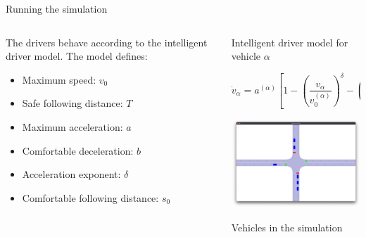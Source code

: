 \documentclass[english, aspectratio=169]{beamer}
\begin{document}
\begin{frame}{Running the simulation}
\begin{columns}

\begin{column}{0.4\textwidth}
	The drivers behave according to the intelligent driver model. The model defines:
	\begin{itemize}
		\item Maximum speed: $v_{0}$
		\item Safe following distance: $T$
		\item Maximum acceleration: $a$
		\item Comfortable deceleration: $b$
		\item Acceleration exponent: $\delta$
		\item Comfortable following distance: $s_{0}$
	\end{itemize}
\end{column}

\begin{column}{0.6\textwidth}
	\begin{block}{Intelligent driver model for vehicle $\alpha$}	
		\begin{scriptsize}
		\begin{equation*}
		\dot{v}_{\alpha}=a^{(\alpha)}\left[1-\left(\frac{v_{\alpha}}{v_{0}^{(\alpha)}}\right)^{\delta}-\left(\frac{s^{*}(v_{\alpha},\Delta v_{\alpha})}{s_{\alpha}}\right)^{2}\right]
		\end{equation*}
		
		\end{scriptsize}
	\end{block}	
	
	\begin{center}
	\includegraphics[width=5cm, keepaspectratio]{images/junction_trafficlight.png}
	\par	
	\begin{scriptsize}Vehicles in the simulation\end{scriptsize}
	\end{center}	
	
\end{column}
\end{columns}
\end{frame}
\end{document}
